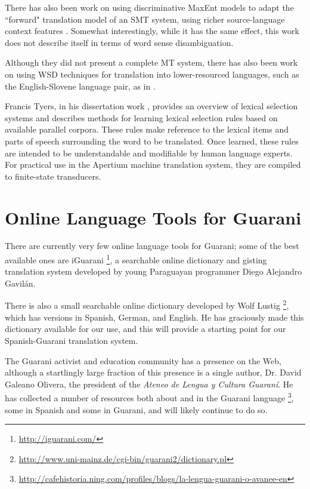 There has also been work on using discriminative MaxEnt models to adapt
the ``forward" translation model of an SMT system, using richer
source-language context features \cite{vzabokrtsky-popel-marevcek:2010:WMT}.
Somewhat interestingly, while it has the same effect, this work does not
describe itself in terms of word sense disambiguation.

Although they did not present a complete MT system, there has also been work
on using WSD techniques for translation into lower-resourced languages, such as
the English-Slovene language pair, as in
\cite{vintar-fivser-vrvsvcaj:2012:ESIRMT-HyTra2012}. 


Francis Tyers, in his dissertation work \cite{tyers-dissertation},
provides an overview of lexical selection systems and describes methods for
learning lexical selection rules based on available parallel corpora.
These rules make reference to the lexical items and parts of speech surrounding
the word to be translated. Once learned, these rules are intended to be
understandable and modifiable by human language experts. For practical use in
the Apertium machine translation system, they are compiled to finite-state
transducers.

\section{Online Language Tools for Guarani}
There are currently very few online language tools for Guarani; some of the
best available ones are iGuarani \footnote{\url{http://iguarani.com/}}, a
searchable online dictionary and gisting translation system developed by young
Paraguayan programmer Diego Alejandro Gavilán.

There is also a small searchable online dictionary developed by Wolf Lustig
\footnote{\url{http://www.uni-mainz.de/cgi-bin/guarani2/dictionary.pl}},
which has versions in Spanish, German, and English. He has graciously made this
dictionary available for our use, and this will provide a starting point for
our Spanish-Guarani translation system.

The Guarani activist and education community has a presence on the Web,
although a startlingly large fraction of this presence is a single author,
Dr. David Galeano Olivera, the president of the \emph{Ateneo de Lengua y
Cultura Guaraní}. He has collected a number of resources both about and in the
Guarani language
\footnote{\url{http://cafehistoria.ning.com/profiles/blogs/la-lengua-guarani-o-avanee-en}},
some in Spanish and some in Guarani, and will likely continue to do so.


